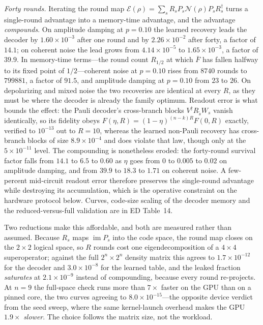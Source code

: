 \documentclass[aps,prxquantum,reprint,superscriptaddress]{revtex4-2}
\begin{document}
\emph{Forty rounds.} Iterating the round map
$\mathcal{E}(\rho)=\sum_s R_sP_s\mathcal{N}(\rho)P_sR_s^\dagger$ turns a
single-round advantage into a memory-time advantage, and the advantage
\emph{compounds}. On amplitude damping at $p=0.10$ the learned recovery leads
the decoder by $1.60\times10^{-3}$ after one round and by $2.26\times10^{-2}$
after forty, a factor of $14.1$; on coherent noise the lead grows from
$4.14\times10^{-5}$ to $1.65\times10^{-3}$, a factor of $39.9$. In memory-time
terms---the round count $R_{1/2}$ at which $\bar F$ has fallen halfway to its
fixed point of $1/2$---coherent noise at $p=0.10$ rises from $8740$ rounds to
$799881$, a factor of $91.5$, and amplitude damping at $p=0.10$ from $23$ to
$26$. On depolarizing and mixed noise the two recoveries are identical at every
$R$, as they must be where the decoder is already the family optimum. Readout
error is what bounds the effect: the Pauli decoder's cross-branch blocks
$V^\dagger R_{\tilde s}W_s$ vanish identically, so its fidelity obeys
$F(\eta,R)=(1-\eta)^{(n-k)R}F(0,R)$ exactly, verified to $10^{-13}$ out to
$R=10$, whereas the learned non-Pauli recovery has cross-branch blocks of size
$8.9\times10^{-4}$ and does violate that law, though only at the
$5\times10^{-11}$ level. The compounding is nonetheless eroded: the forty-round
survival factor falls from $14.1$ to $6.5$ to $0.60$ as $\eta$ goes from $0$ to
$0.005$ to $0.02$ on amplitude damping, and from $39.9$ to $18.3$ to $1.71$ on
coherent noise. A few-percent mid-circuit readout error therefore preserves the
single-round advantage while destroying its accumulation, which is the operative
constraint on the hardware protocol below. Curves, code-size scaling of the
decoder memory and the reduced-versus-full validation are in ED Table~14.

Two reductions make this affordable, and both are measured rather than assumed.
Because $R_s$ maps $\operatorname{im}P_s$ into the code space, the round map
closes on the $2\times2$ logical space, so $R$ rounds cost one
eigendecomposition of a $4\times4$ superoperator; against the full
$2^n\times2^n$ density matrix this agrees to $1.7\times10^{-12}$ for the decoder
and $3.0\times10^{-8}$ for the learned table, and the leaked fraction
\emph{saturates} at $2.1\times10^{-9}$
instead of compounding, because every round re-projects. At $n=9$ the full-space
check runs more than $7\times$ faster on the GPU than on a pinned core, the two
curves agreeing to $8.0\times10^{-15}$---the opposite device verdict from the
seed sweep, where the same kernel-launch overhead makes the GPU $1.9\times$
\emph{slower}. The choice follows the matrix size, not the workload.
\end{document}
